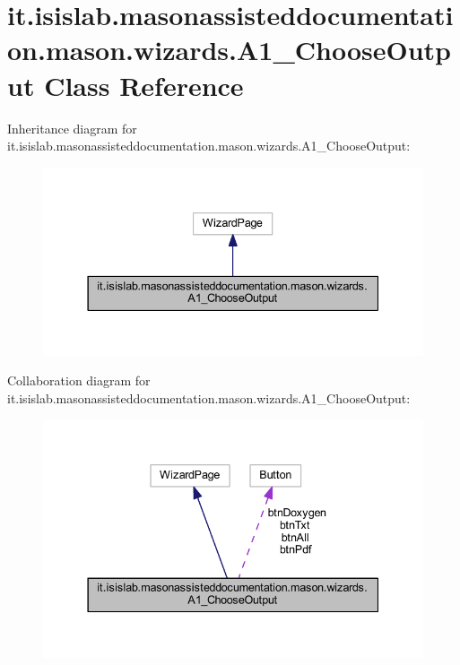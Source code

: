 \hypertarget{classit_1_1isislab_1_1masonassisteddocumentation_1_1mason_1_1wizards_1_1_a1___choose_output}{\section{it.\-isislab.\-masonassisteddocumentation.\-mason.\-wizards.\-A1\-\_\-\-Choose\-Output Class Reference}
\label{classit_1_1isislab_1_1masonassisteddocumentation_1_1mason_1_1wizards_1_1_a1___choose_output}
}


Inheritance diagram for it.\-isislab.\-masonassisteddocumentation.\-mason.\-wizards.\-A1\-\_\-\-Choose\-Output\-:
\nopagebreak
\begin{figure}[H]
\begin{center}
\leavevmode
\includegraphics[width=337pt]{classit_1_1isislab_1_1masonassisteddocumentation_1_1mason_1_1wizards_1_1_a1___choose_output__inherit__graph}
\end{center}
\end{figure}


Collaboration diagram for it.\-isislab.\-masonassisteddocumentation.\-mason.\-wizards.\-A1\-\_\-\-Choose\-Output\-:
\nopagebreak
\begin{figure}[H]
\begin{center}
\leavevmode
\includegraphics[width=337pt]{classit_1_1isislab_1_1masonassisteddocumentation_1_1mason_1_1wizards_1_1_a1___choose_output__coll__graph}
\end{center}
\end{figure}
